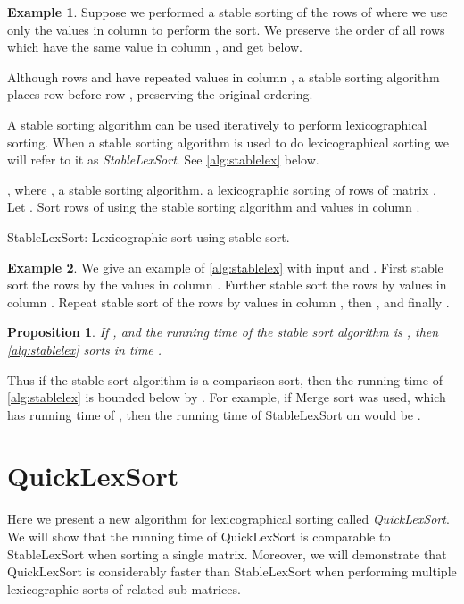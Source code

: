 \documentclass[a4paper,10pt,reqno]{amsart}
\newtheorem{proposition}{Proposition}
\theoremstyle{definition}
\newtheorem{example}{Example}
\begin{document}
\begin{example}
Suppose we performed a stable sorting of the rows of  where we use only the values in
column  to perform the sort.  We preserve the order of all rows which have
the same value in column , and get  below.

Although rows  and  have repeated values in column , a stable sorting
algorithm places row  before row , preserving the original
ordering.
\end{example}

A stable sorting algorithm can be used iteratively to perform
lexicographical sorting. When a stable sorting algorithm is used to do
lexicographical sorting we will refer to it as \emph{StableLexSort}.
See \autoref{alg:stablelex} below.

\begin{algorithm}
\begin{algorithmic}[1]
    \REQUIRE ,  where  ,  a stable sorting algorithm.
    \ENSURE  a lexicographic sorting of rows of matrix .
    \STATE Let .
    \FOR{}
        \STATE Sort rows of  using the stable sorting algorithm  and values in column .
    \ENDFOR
    \RETURN 
\end{algorithmic}
\caption{StableLexSort: Lexicographic sort using stable sort.}
\label{alg:stablelex}
\end{algorithm}

\begin{example}
We give an example of \autoref{alg:stablelex} with input  and .
First stable sort the rows  by the values in column . Further stable sort
the rows by values in column .  Repeat stable sort of the rows by values in
column , then , and finally
.

\end{example}

\begin{proposition}
If , and the running time of the stable sort algorithm
 is , then \autoref{alg:stablelex} sorts in time .
\end{proposition}

Thus if the stable sort algorithm  is a comparison sort, then the running
time of \autoref{alg:stablelex} is bounded below by .
For example, if Merge sort \cite{Knuth:1998fk} was used, which has running time
of , then the running time of StableLexSort on  would be
.

\section{QuickLexSort}
\label{sec:qls}
Here we present a new algorithm for lexicographical sorting called
\emph{QuickLexSort}.  We will show that the running time of QuickLexSort is
comparable to StableLexSort when sorting a single matrix. Moreover, we will
demonstrate that QuickLexSort is considerably faster than StableLexSort when
performing multiple lexicographic sorts of related sub-matrices.
\end{document}

